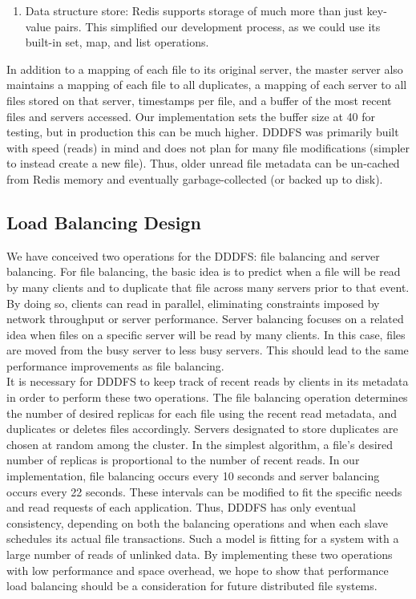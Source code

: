\documentclass[twoside]{article}
\begin{document}
\begin{multicols}{2}
\begin{enumerate}
	\item Data structure store: Redis supports storage of much more than just key-value pairs. This simplified our development process, as we could use its built-in set, map, and list operations. 
\end{enumerate}
In addition to a mapping of each file to its original server, the master server also maintains a mapping of each file to all duplicates, a mapping of each server to all files stored on that server, timestamps per file, and a buffer of the most recent files and servers accessed. Our implementation sets the buffer size at 40 for testing, but in production this can be much higher. DDDFS was primarily built with speed (reads) in mind and does not plan for many file modifications (simpler to instead create a new file). Thus, older unread file metadata can be un-cached from Redis memory and eventually garbage-collected (or backed up to disk).

\subsection*{Load Balancing Design}
We have conceived two operations for the DDDFS: file balancing and server balancing. For file balancing, the basic idea is to predict when a file will be read by many clients and to duplicate that file across many servers prior to that event. By doing so, clients can read in parallel, eliminating constraints imposed by network throughput or server performance. Server balancing focuses on a related idea when files on a specific server will be read by many clients. In this case, files are moved from the busy server to less busy servers. This should lead to the same performance improvements as file balancing. \\\indent
It is necessary for DDDFS to keep track of recent reads by clients in its metadata in order to perform these two operations.  The file balancing operation determines the number of desired replicas for each file using the recent read metadata, and duplicates or deletes files accordingly. Servers designated to store duplicates are chosen at random among the cluster. In the simplest algorithm, a file's desired number of replicas is proportional to the number of recent reads. In our implementation, file balancing occurs every 10 seconds and server balancing occurs every 22 seconds. These intervals can be modified to fit the specific needs and read requests of each application. Thus, DDDFS has only eventual consistency, depending on both the balancing operations and when each slave schedules its actual file transactions. Such a model is fitting for a system with a large number of reads of unlinked data. By implementing these two operations with low performance and space overhead, we hope to show that performance load balancing should be a consideration for future distributed file systems. 


\end{multicols}
\end{document}
